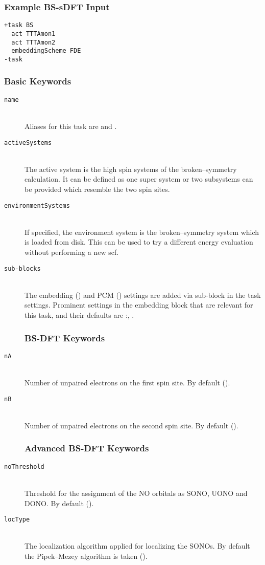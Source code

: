 \subsubsection{Example BS-sDFT Input}
\begin{lstlisting}
+task BS
  act TTTAmon1
  act TTTAmon2
  embeddingScheme FDE
-task
\end{lstlisting}

\subsubsection{Basic Keywords}
\begin{description}
	\item [\texttt{name}]\hfill \\
	Aliases for this task are  and .
	\item [\texttt{activeSystems}]\hfill \\
	The active system is the high spin systems of the broken--symmetry calculation. It can
	be defined as one super system or two subsystems can be provided which resemble the two
	spin sites.
	\item [\texttt{environmentSystems}]\hfill \\
	If specified, the environment system is the broken--symmetry system which is loaded
	from disk. This can be used to try a different energy evaluation without performing a 
	new scf.
	\item[\texttt{sub-blocks}]\hfill \\
	The embedding () and PCM () settings are added via sub-block 
	in the task settings. Prominent
	settings in the embedding block that are relevant for this task, and their defaults are
	:, .
\subsubsection{BS-DFT Keywords}
	\item [\texttt{nA}]\hfill \\
	Number of unpaired electrons on the first spin site. By default ().
	\item [\texttt{nB}]\hfill \\
	Number of unpaired electrons on the second spin site. By default ().
\subsubsection{Advanced BS-DFT Keywords}
	\item [\texttt{noThreshold}]\hfill \\
	Threshold for the assignment of the NO orbitals as SONO, UONO and DONO. By default ().
	\item [\texttt{locType}]\hfill \\
	The localization algorithm applied for localizing the SONOs. By default the
	Pipek--Mezey algorithm is taken ().

\end{description}
